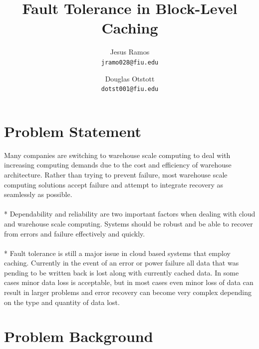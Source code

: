\documentclass[letterpaper,12pt]{article}
\title{Fault Tolerance in Block-Level Caching}
\author{
  Jesus Ramos \\ \texttt{jramo028@fiu.edu} \and
  Douglas Otstott \\ \texttt{dotst001@fiu.edu}
}
\date{}
\begin{document}
\maketitle

\section*{Problem Statement}

Many companies are switching to warehouse scale computing to deal with
increasing computing demands due to the cost and efficiency of
warehouse architecture. Rather than trying to prevent failure, most
warehouse scale computing solutions accept failure and attempt to
integrate recovery as seamlessly as possible\cite{Placeholder}.
\\ \\*
Dependability and reliability are two important factors when dealing
with cloud and warehouse scale computing. Systems should be robust and
be able to recover from errors and failure effectively and quickly.
\\ \\*
Fault tolerance is still a major issue in cloud based systems that
employ caching. Currently in the event of an error or power failure
all data that was pending to be written back is lost along with
currently cached data. In some cases minor data loss is acceptable,
but in most cases even minor loss of data can result in larger
problems and error recovery can become very complex depending on the
type and quantity of data lost.


\section*{Problem Background}
\end{document}
